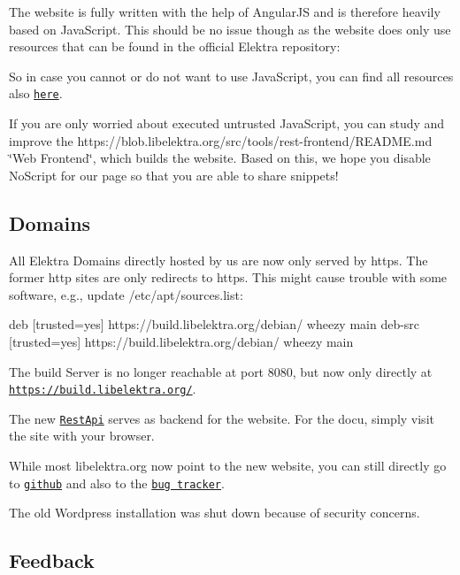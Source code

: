 The website is fully written with the help of Angular\+JS and is therefore heavily based on Java\+Script. This should be no issue though as the website does only use resources that can be found in the official Elektra repository\+:


\begin{DoxyEnumerate}
\item So in case you cannot or do not want to use Java\+Script, you can find all resources also \href{https://git.libelektra.org}{\tt here}.
\item If you are only worried about executed untrusted Java\+Script, you can study and improve the https\+://blob.libelektra.\+org/src/tools/rest-\/frontend/\+R\+E\+A\+D\+ME.md \char`\"{}\+Web Frontend\char`\"{}, which builds the website. Based on this, we hope you disable {\ttfamily No\+Script} for our page so that you are able to share snippets!
\end{DoxyEnumerate}

\subsection*{Domains}

All Elektra Domains directly hosted by us are now only served by {\ttfamily https}. The former {\ttfamily http} sites are only redirects to {\ttfamily https}. This might cause trouble with some software, e.\+g., update {\ttfamily /etc/apt/sources.list}\+: \begin{DoxyVerb}deb     [trusted=yes] https://build.libelektra.org/debian/ wheezy main
deb-src [trusted=yes] https://build.libelektra.org/debian/ wheezy main
\end{DoxyVerb}


The build Server is no longer reachable at port 8080, but now only directly at \href{https://build.libelektra.org/}{\tt https\+://build.\+libelektra.\+org/}.

The new \href{https://restapi.libelektra.org}{\tt Rest\+Api} serves as backend for the website. For the docu, simply visit the site with your browser.

While most {\ttfamily libelektra.\+org} now point to the new website, you can still directly go to \href{https://git.libelektra.org}{\tt github} and also to the \href{https://bugs.libelektra.org}{\tt bug tracker}.

The old Wordpress installation was shut down because of security concerns.

\subsection*{Feedback}

